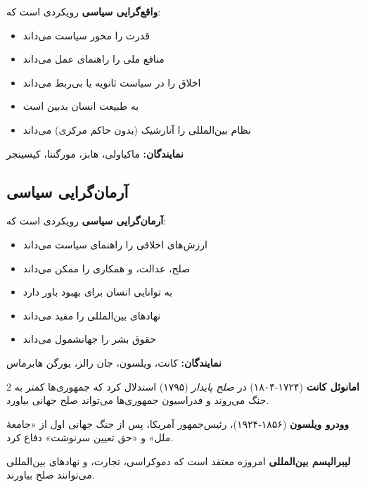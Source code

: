 \begin{tcolorbox}[
    enhanced,
    colback=rightblue!8,
    colframe=rightblue,
    boxrule=1.5pt,
    arc=5pt,
    fonttitle=\bfseries,
    title={\rl{🔵 تعریف: واقع‌گرایی سیاسی}}
]
\textbf{واقع‌گرایی سیاسی} رویکردی است که:
\begin{itemize}[nosep=true]
    \item قدرت را محور سیاست می‌داند
    \item منافع ملی را راهنمای عمل می‌داند
    \item اخلاق را در سیاست ثانویه یا بی‌ربط می‌داند
    \item به طبیعت انسان بدبین است
    \item نظام بین‌المللی را آنارشیک (بدون حاکم مرکزی) می‌داند
\end{itemize}

\textbf{نمایندگان:} ماکیاولی، هابز، مورگنتا، کیسینجر
\end{tcolorbox}

\subsection{آرمان‌گرایی سیاسی}

\begin{tcolorbox}[
    enhanced,
    colback=centergreen!8,
    colframe=centergreen,
    boxrule=1.5pt,
    arc=5pt,
    fonttitle=\bfseries,
    title={\rl{🟢 تعریف: آرمان‌گرایی سیاسی}}
]
\textbf{آرمان‌گرایی سیاسی} رویکردی است که:
\begin{itemize}
    \item ارزش‌های اخلاقی را راهنمای سیاست می‌داند
    \item صلح، عدالت، و همکاری را ممکن می‌داند
    \item به توانایی انسان برای بهبود باور دارد
    \item نهادهای بین‌المللی را مفید می‌داند
    \item حقوق بشر را جهانشمول می‌داند
\end{itemize}

\textbf{نمایندگان:} کانت، ویلسون، جان رالز، یورگن هابرماس
\end{tcolorbox}

\begin{multicols}{2}
\textbf{امانوئل کانت} (۱۷۲۴-۱۸۰۴) در \textit{صلح پایدار} (۱۷۹۵) استدلال کرد که جمهوری‌ها کمتر به جنگ می‌روند و فدراسیون جمهوری‌ها می‌تواند صلح جهانی بیاورد.

\textbf{وودرو ویلسون} (۱۸۵۶-۱۹۲۴)، رئیس‌جمهور آمریکا، پس از جنگ جهانی اول از «جامعهٔ ملل» و «حق تعیین سرنوشت» دفاع کرد.

\textbf{لیبرالیسم بین‌المللی} امروزه معتقد است که دموکراسی، تجارت، و نهادهای بین‌المللی می‌توانند صلح بیاورند.
\end{multicols}

